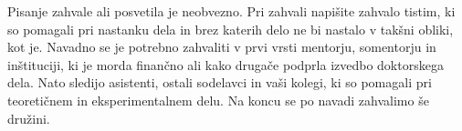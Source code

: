 
Pisanje zahvale ali posvetila je neobvezno. Pri zahvali napišite zahvalo tistim, ki so pomagali pri nastanku dela in brez katerih delo ne bi nastalo v takšni obliki, kot je. Navadno se je potrebno zahvaliti v prvi vrsti mentorju, somentorju in inštituciji, ki je morda finančno ali kako drugače podprla izvedbo doktorskega dela. Nato sledijo asistenti, ostali sodelavci in vaši kolegi, ki so pomagali pri teoretičnem in eksperimentalnem delu. Na koncu se po navadi zahvalimo še družini.
